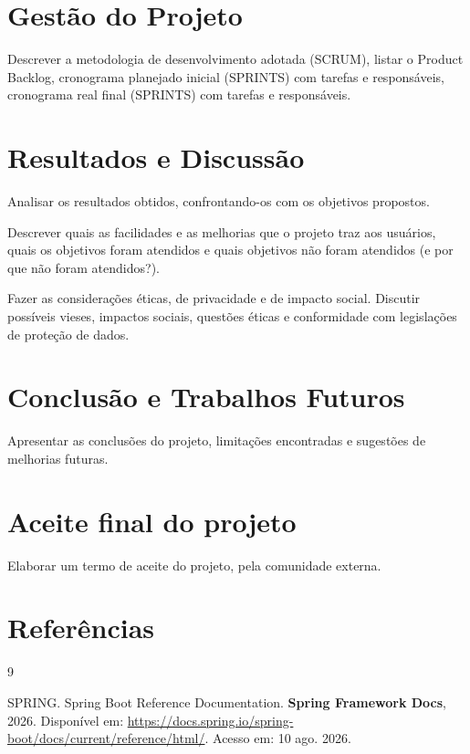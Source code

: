 \documentclass[
    12pt,           %
    oneside,        %
    a4paper,        %
    chapter=TITLE,  %
    english,        %
    brazil          %
]{abntex2}
\begin{document}
\chapter{Gestão do Projeto}

Descrever a metodologia de desenvolvimento adotada (SCRUM), listar o Product Backlog,
cronograma planejado inicial (SPRINTS) com tarefas e responsáveis, cronograma real final
(SPRINTS) com tarefas e responsáveis.

\chapter{Resultados e Discussão}

Analisar os resultados obtidos, confrontando-os com os objetivos propostos.

Descrever quais as facilidades e as melhorias que o projeto traz aos usuários, quais os
objetivos foram atendidos e quais objetivos não foram atendidos (e por que não foram
atendidos?).

Fazer as considerações éticas, de privacidade e de impacto social. Discutir possíveis vieses,
impactos sociais, questões éticas e conformidade com legislações de proteção de dados.

\chapter{Conclusão e Trabalhos Futuros}

Apresentar as conclusões do projeto, limitações encontradas e sugestões de melhorias
futuras.

\chapter{Aceite final do projeto}

Elaborar um termo de aceite do projeto, pela comunidade externa.

\postextual

\chapter{Referências}

\begin{thebibliography}{9}

SPRING.
Spring Boot Reference Documentation.
\textbf{Spring Framework Docs}, 2026.
Disponível em: \url{https://docs.spring.io/spring-boot/docs/current/reference/html/}.
Acesso em: 10 ago. 2026.

\end{thebibliography}
\end{document}
